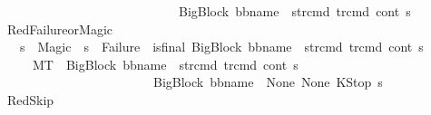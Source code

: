 \begin{isabellebody}
\ \ \ \ \ \ \ \ \ \ \ \ \ \ \ \ \ \ \ \ \ \ \ \ \ \ \ \ \ \ {\isacharparenleft}{\kern0pt}{\isacharparenleft}{\kern0pt}BigBlock\ bb{\isacharunderscore}{\kern0pt}name\ {\isacharbrackleft}{\kern0pt}{\isacharbrackright}{\kern0pt}\ str{\isacharunderscore}{\kern0pt}cmd\ tr{\isacharunderscore}{\kern0pt}cmd{\isacharparenright}{\kern0pt}{\isacharcomma}{\kern0pt}\ cont{}{\isacharcomma}{\kern0pt}\ s{}{\isacharparenright}{\kern0pt}{\isachardoublequoteclose}\ \ \isanewline
\isanewline
\ \ {\isacharbar}{\kern0pt}\ RedFailure{\isacharunderscore}{\kern0pt}or{\isacharunderscore}{\kern0pt}Magic{\isacharcolon}{\kern0pt}\ \isanewline
\ \ \ \ {\isachardoublequoteopen}{\isasymlbrakk}\ {\isacharparenleft}{\kern0pt}s{}\ {\isacharequal}{\kern0pt}\ Magic{\isacharparenright}{\kern0pt}\ {\isasymor}\ {\isacharparenleft}{\kern0pt}s{}\ {\isacharequal}{\kern0pt}\ Failure{\isacharparenright}{\kern0pt}{\isacharsemicolon}{\kern0pt}\ {\isasymnot}\ {\isacharparenleft}{\kern0pt}is{\isacharunderscore}{\kern0pt}final\ {\isacharparenleft}{\kern0pt}{\isacharparenleft}{\kern0pt}BigBlock\ bb{\isacharunderscore}{\kern0pt}name\ {\isacharbrackleft}{\kern0pt}{\isacharbrackright}{\kern0pt}\ str{\isacharunderscore}{\kern0pt}cmd\ tr{\isacharunderscore}{\kern0pt}cmd{\isacharparenright}{\kern0pt}{\isacharcomma}{\kern0pt}\ cont{}{\isacharcomma}{\kern0pt}\ s{}{\isacharparenright}{\kern0pt}{\isacharparenright}{\kern0pt}\ \ {\isasymrbrakk}\ \isanewline
\ \ \ \ \ \ {\isasymLongrightarrow}\ M{\isacharcomma}{\kern0pt}{\isasymLambda}{\isacharcomma}{\kern0pt}{\isasymGamma}{\isacharcomma}{\kern0pt}{\isasymOmega}{\isacharcomma}{\kern0pt}T\ {\isasymturnstile}\ {\isasymlangle}{\isacharparenleft}{\kern0pt}{\isacharparenleft}{\kern0pt}BigBlock\ bb{\isacharunderscore}{\kern0pt}name\ {\isacharbrackleft}{\kern0pt}{\isacharbrackright}{\kern0pt}\ str{\isacharunderscore}{\kern0pt}cmd\ tr{\isacharunderscore}{\kern0pt}cmd{\isacharparenright}{\kern0pt}{\isacharcomma}{\kern0pt}\ cont{}{\isacharcomma}{\kern0pt}\ s{}{\isacharparenright}{\kern0pt}{\isasymrangle}\ {\isasymlongrightarrow}\ \isanewline
\ \ \ \ \ \ \ \ \ \ \ \ \ \ \ \ \ \ \ \ \ \ \ \ \ \ {\isacharparenleft}{\kern0pt}{\isacharparenleft}{\kern0pt}BigBlock\ bb{\isacharunderscore}{\kern0pt}name\ {\isacharbrackleft}{\kern0pt}{\isacharbrackright}{\kern0pt}\ None\ None{\isacharparenright}{\kern0pt}{\isacharcomma}{\kern0pt}\ KStop{\isacharcomma}{\kern0pt}\ s{}{\isacharparenright}{\kern0pt}{\isachardoublequoteclose}\isanewline
\isanewline
\ \ {\isacharbar}{\kern0pt}\ RedSkip{\isacharcolon}{\kern0pt}\ \isanewline

\end{isabellebody}
